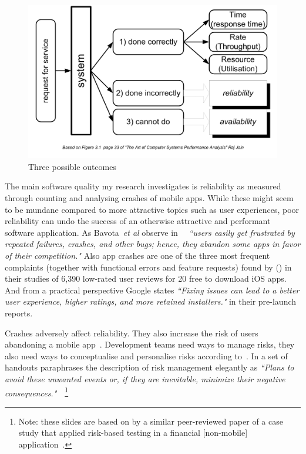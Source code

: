 \begin{figure}[htbp!]
    \centering
    \includegraphics[width=14cm]{images/commercetest/raj-jain-performance-reliability-availability.png}
    \caption{Three possible outcomes}
    \label{fig:three-possible-ourcomes}
\end{figure}

The main software quality my research investigates is reliability as measured through counting and analysing crashes of mobile apps. While these might seem to be mundane compared to more attractive topics such as user experiences, poor reliability can undo the success of an otherwise attractive and performant software application. As Bavota~\emph{et al} observe in~\cite{bavota2014_impact_of_api_change_android} ~\emph{``users easily get frustrated by repeated failures, crashes, and other bugs; hence, they abandon some apps in favor of their competition."} Also app crashes are one of the three most frequent complaints (together with functional errors and feature requests) found by (\cite{khalid2015_what_do_mobile_app_users_complain_about}) in their studies of 6,390 low-rated user reviews for 20 free to download iOS apps. And from a practical perspective Google states \emph{``Fixing issues can lead to a better user experience, higher ratings, and more retained installers."} in their pre-launch reports.

Crashes adversely affect reliability. They also increase the risk of users abandoning a mobile app~\citep{dimensionalresearch2015_mobile_app_use_and_abandonment}. Development teams need ways to manage risks, they also need ways to conceptualise and personalise risks according to~\citet{pfleeger2000_risky_business}. In a set of handouts paraphrases the description of risk management elegantly as \textit{``Plans to avoid these unwanted events or, if they are inevitable, minimize their negative consequences."}~\citep{amland2002_slides}~\footnote{Note: these slides are based on by a similar peer-reviewed paper of a case study that applied risk-based testing in a financial [non-mobile] application~\citep{Amland_2000_rbt_financial_case_study}.}


